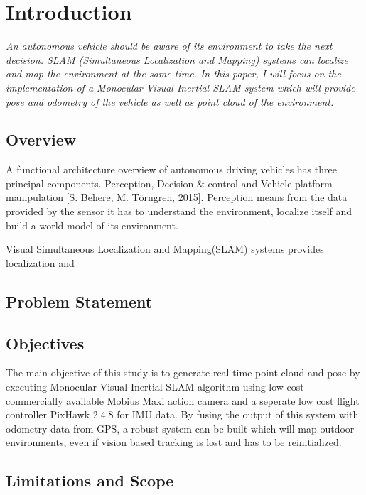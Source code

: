 \setlength{\footskip}{8mm}

\chapter{Introduction}

\textit{An autonomous vehicle should be aware of its environment to take the next decision. SLAM (Simultaneous Localization and Mapping) systems can localize and map the environment at the same time. In this paper, I will focus on the implementation of a Monocular Visual Inertial SLAM system which will provide pose and odometry of the vehicle as well as point cloud of the environment.}

\section{Overview}

A functional architecture overview of autonomous driving vehicles has three principal components. Perception, Decision \& control and Vehicle platform manipulation [S. Behere, M. Törngren, 2015]. Perception means from the data provided by the sensor it has to understand the environment, localize itself and build a world model of its environment.

Visual Simultaneous Localization and Mapping(SLAM) systems provides localization and 

\section{Problem Statement}



\section{Objectives}

The main objective of this study is to generate real time point cloud and pose by executing Monocular Visual Inertial SLAM algorithm using low cost commercially available Mobius Maxi action camera and a seperate low cost flight controller PixHawk 2.4.8 for IMU data. By fusing the output of this system with odometry data from GPS, a robust system can be built which will map outdoor environments, even if vision based tracking is lost and has to be reinitialized.

\section{Limitations and Scope}

